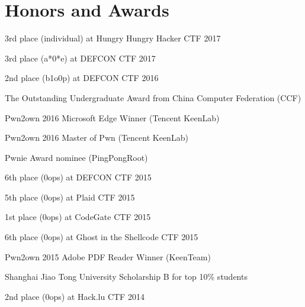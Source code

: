 \section*{Honors and Awards}
\begin{description}
	\item 3rd place (individual) at Hungry Hungry Hacker CTF 2017 
	\item 3rd place (a*0*e) at DEFCON CTF 2017 
	\item 2nd place (b1o0p) at DEFCON CTF 2016 
	\item The Outstanding Undergraduate Award from China Computer Federation (CCF) 
	\item Pwn2own 2016 Microsoft Edge Winner (Tencent KeenLab) 
	\item Pwn2own 2016 Master of Pwn (Tencent KeenLab) 
	\item Pwnie Award nominee (PingPongRoot) 
	\item 6th place (0ops) at DEFCON CTF 2015 
	\item 5th place (0ops) at Plaid CTF 2015 
	\item 1st place (0ops) at CodeGate CTF 2015 
	\item 6th place (0ops) at Ghost in the Shellcode CTF 2015 
	\item Pwn2own 2015 Adobe PDF Reader Winner (KeenTeam) 
	\item Shanghai Jiao Tong University Scholarship B for top 10\% students 
	\item 2nd place (0ops) at Hack.lu CTF 2014 
\end{description}
